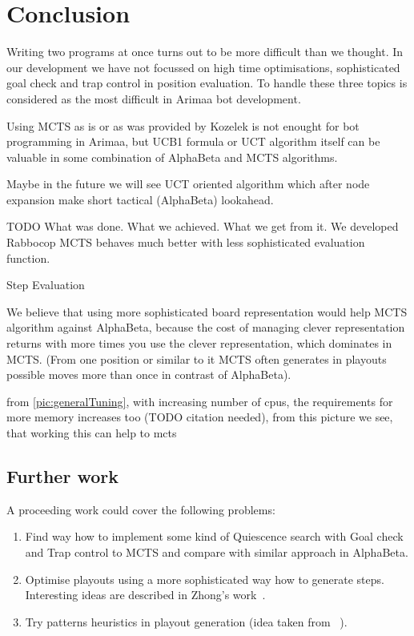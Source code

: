 \chapter{Conclusion}
Writing two programs at once turns out to be more difficult than we thought. In
our development we have not focussed on high time optimisations,
sophisticated goal check and trap control in position evaluation. To handle these three topics is considered as the most difficult in Arimaa bot development.

Using MCTS as is or as was provided by Kozelek is not enought for bot
programming in Arimaa, but UCB1 formula or UCT algorithm itself can be valuable
in some combination of AlphaBeta and MCTS algorithms.

Maybe in the future we will see UCT oriented algorithm which after node expansion make short tactical (AlphaBeta) lookahead.

TODO What was done. What we achieved. What we get from it.
We developed Rabbocop
MCTS behaves much better with less sophisticated evaluation function.

Step Evaluation 

We believe that using more sophisticated board representation would help MCTS
algorithm against AlphaBeta, because the cost of managing clever representation
returns with more times you use the clever representation, which dominates in
MCTS. (From one position or similar to it MCTS often generates in playouts
possible moves more than once in contrast of AlphaBeta).

from \ref{pic:generalTuning}, with increasing number of cpus, the requirements for more memory increases too (TODO citation needed), from this picture we see, that working this can help to mcts


\section{Further work}

A proceeding work could cover the following problems:

\begin{enumerate}
\item Find way how to implement some kind of Quiescence search with Goal check and Trap control to MCTS and compare with similar approach in AlphaBeta.
\item Optimise playouts using a more sophisticated way how to generate steps. Interesting ideas are described in Zhong's work~\cite{ZHONG}.
\item Try patterns heuristics in playout generation (idea taken from ~\cite{PatternsGo,PatternsArimaa}).
\end{enumerate}

